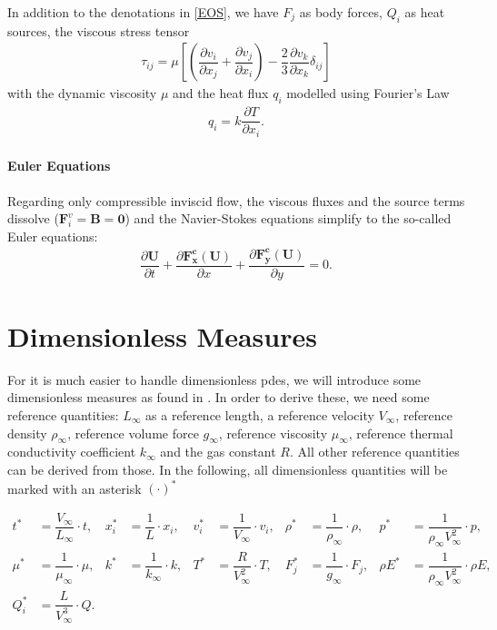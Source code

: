 		In addition to the denotations in \cref{EOS}, we have $F_j$ as body forces, $Q_i$ as heat sources, the viscous stress tensor
		\begin{align}
			\tau_{ij} = \mu \left[\left(\dfrac{\partial v_i}{\partial x_j} + \dfrac{\partial v_j}{\partial x_i} \right) - \dfrac{2}{3} \dfrac{\partial v_k}{\partial x_k} \delta_{ij}\right]
		\end{align}
		with the dynamic viscosity $\mu$ and the heat flux $q_i$ modelled using Fourier's Law
		\begin{align}
			q_i = k \dfrac{\partial T}{\partial x_i}.
		\end{align}
		
			\paragraph{Euler Equations}
			Regarding only compressible inviscid flow, the viscous fluxes and the source terms dissolve ($\mathbf{F}_i^v = \mathbf{B} = \mathbf{0}$) and the Navier-Stokes equations simplify to the so-called Euler equations: 
			\begin{align}
				\dfrac{\partial \mathbf{U}}{\partial t} + \dfrac{\partial \mathbf{F_x^c(U)}}{\partial x} + \dfrac{\partial \mathbf{F_y^c(U)}}{\partial y} = 0.
			\end{align}
	
	
	\section{Dimensionless Measures}
	For it is much easier to handle dimensionless \gls{pde}s, we will introduce some dimensionless measures as found in \textcite{annualreport}. In order to derive these, we need some reference quantities: $L_\infty$ as a reference length, a reference velocity $V_\infty$, reference density $\rho_\infty$, reference volume force $g_\infty$, reference viscosity $\mu_\infty$, reference thermal conductivity coefficient $k_\infty$ and the gas constant $R$. All other reference quantities can be derived from those. In the following, all dimensionless quantities will be marked with an asterisk $(\cdot)^*$
	
	\begin{align}
		t^* &= \dfrac{V_\infty}{L_\infty} \cdot t,& x_i^* &= \dfrac{1}{L} \cdot x_i, & v_i^* &= \dfrac{1}{V_\infty}\cdot v_i, & \rho^* &= \dfrac{1}{\rho_\infty} \cdot \rho, & p^* &= \dfrac{1}{\rho_\infty V_\infty^2} \cdot p, \\ \nonumber
		 \mu^* &= \dfrac{1}{\mu_\infty} \cdot \mu , & k^* &= \dfrac{1}{k_\infty} \cdot k,&  T^* &= \dfrac{R}{V_\infty^2}\cdot T, & F_j^*& = \dfrac{1}{g_\infty} \cdot F_j, & \rho E^* &= \dfrac{1}{\rho_\infty V_\infty^2} \cdot \rho E, \\ \nonumber
		 Q_i^* &= \dfrac{L}{V_\infty^3} \cdot Q. &
	\end{align}
	
